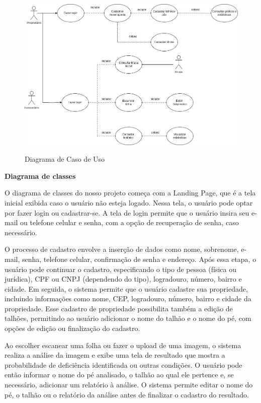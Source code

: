 \begin{figure}[H]
    \centering
    \caption{Diagrama de Caso de Uso}
    \includegraphics[width=0.7\linewidth]{Illustrations/CasoUso.jpeg}
    \label{fig:caso-uso}
    \end{figure}

\textbf{Diagrama de classes}

O diagrama de classes do nosso projeto  começa com a Landing Page, que é a tela inicial exibida caso o usuário não esteja logado. Nessa tela, o usuário pode optar por fazer login ou cadastrar-se. A tela de login permite que o usuário insira seu e-mail ou telefone celular e senha, com a opção de recuperação de senha, caso necessário.

O processo de cadastro envolve a inserção de dados como nome, sobrenome, e-mail, senha, telefone celular, confirmação de senha e endereço. Após essa etapa, o usuário pode continuar o cadastro, especificando o tipo de pessoa (física ou jurídica), CPF ou CNPJ (dependendo do tipo), logradouro, número, bairro e cidade. Em seguida, o sistema permite que o usuário cadastre sua propriedade, incluindo informações como nome, CEP, logradouro, número, bairro e cidade da propriedade. Esse cadastro de propriedade possibilita também a edição de talhões, permitindo ao usuário adicionar o nome do talhão e o nome do pé, com opções de edição ou finalização do cadastro.

Ao escolher escanear uma folha ou fazer o upload de uma imagem, o sistema realiza a análise da imagem e exibe uma tela de resultado que mostra a probabilidade de deficiência identificada ou outras condições. O usuário pode então informar o nome do pé analisado, o talhão ao qual ele pertence e, se necessário, adicionar um relatório à análise. O sistema permite editar o nome do pé, o talhão ou o relatório da análise antes de finalizar o cadastro do resultado.

